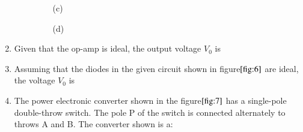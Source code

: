 \documentclass[journal]{IEEEtran}
\numberwithin{equation}{enumi}
\numberwithin{figure}{enumi}
\begin{document}
\begin{enumerate}
\begin{enumerate}
\begin{figure}[H]
        \begin{minipage}{0.45\linewidth}
            \centering
            
            \caption*{(c)}
        \end{minipage}%
        \hfill
        \begin{minipage}{0.45\linewidth}
            \centering
            
            \caption*{(d)}
        \end{minipage}

    \end{figure}
    
\end{enumerate}

\item Given that the op-amp is ideal, the output voltage $V_0$ is
	\begin{figure}[H]
    
			\centering
			
			\caption{}
			\label{fig:5}
		\end{figure}

\begin{enumerate}
\end{enumerate}

\item Assuming that the diodes in the given circuit shown in figure$\ref{fig:6}$ are ideal, the voltage $V_0$ is
\begin{figure}[H]
    
			\centering
			
			\caption{}
			\label{fig:6}
		\end{figure}

\begin{enumerate}
\end{enumerate}

    \item The power electronic converter shown in the figure$\ref{fig:7}$ has a single-pole double-throw switch. The pole P of the switch is connected alternately to throws A and B. The converter shown is a:
    \begin{figure}[H]
    

\end{figure}
\end{enumerate}
\end{document}
